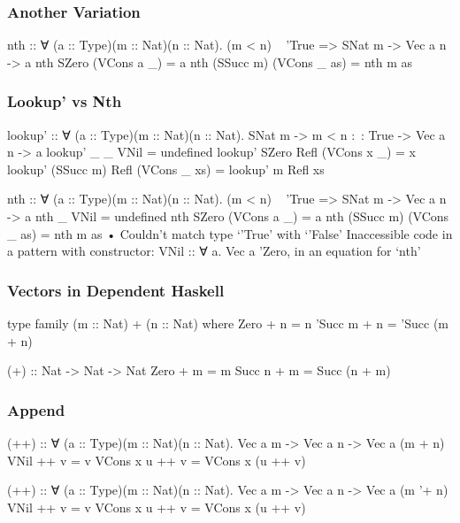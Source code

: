 \documentclass{beamer}
\begin{document}
\begin{frame}[fragile]\frametitle{Another Variation}
\begin{semiverbatim}
nth :: ∀ (a :: Type)(m :: Nat)(n :: Nat).
       (m < n) ~ 'True => SNat m -> Vec a n -> a
nth SZero     (VCons a _)  = a
nth (SSucc m) (VCons _ as) = nth m as
\end{semiverbatim}
\end{frame}

\begin{frame}[fragile]\frametitle{Lookup' vs Nth}
\begin{semiverbatim}
lookup' :: ∀ (a :: Type)(m :: Nat)(n :: Nat).
           SNat m -> m < n :~: True -> Vec a n -> a
lookup' _         _     VNil        = undefined
lookup' SZero     Refl (VCons x _)  = x
lookup' (SSucc m) Refl (VCons _ xs) = lookup' m Refl xs

nth :: ∀ (a :: Type)(m :: Nat)(n :: Nat).
       (m < n) ~ 'True => SNat m -> Vec a n -> a
nth _         VNil         =  undefined
nth SZero     (VCons a _)  = a
nth (SSucc m) (VCons _ as) = nth m as
  • Couldn't match type ‘'True’ with ‘'False’
    Inaccessible code in
      a pattern with constructor: VNil :: ∀ a. Vec a 'Zero,
      in an equation for ‘nth’
\end{semiverbatim}
\end{frame}

\begin{frame}[fragile]\frametitle{Vectors in Dependent Haskell}
\begin{semiverbatim}
type family (m :: Nat) + (n :: Nat) where
  Zero    + n = n
  'Succ m + n = 'Succ (m + n)

(+) :: Nat -> Nat -> Nat
Zero   + m = m
Succ n + m = Succ (n + m)
\end{semiverbatim}
\end{frame}

\begin{frame}[fragile]\frametitle{Append}
\begin{semiverbatim}
(++) :: ∀ (a :: Type)(m :: Nat)(n :: Nat).
        Vec a m -> Vec a n -> Vec a (m + n)
VNil      ++ v = v
VCons x u ++ v = VCons x (u ++ v)

(++) :: ∀ (a :: Type)(m :: Nat)(n :: Nat).
        Vec a m -> Vec a n -> Vec a (m '+ n)
VNil      ++ v = v
VCons x u ++ v = VCons x (u ++ v)
\end{semiverbatim}
\end{frame}
\end{document}
